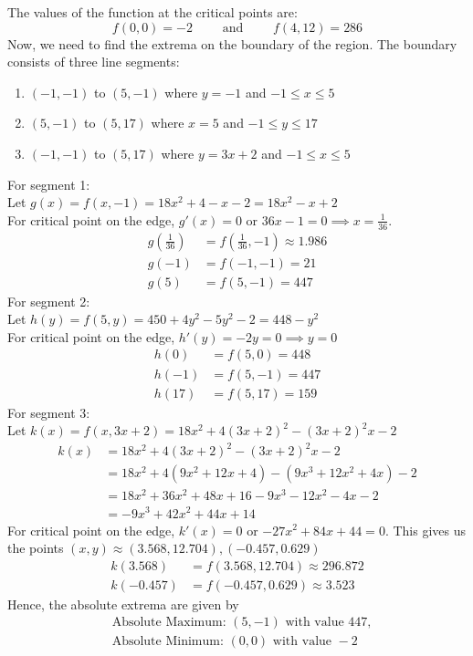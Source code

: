 {    The values of the function at the critical points are: \[ 
        f(0,0) = -2 \qquad \text{ and } \qquad f(4,12) = 286
    \]
    Now, we need to find the extrema on the boundary of the region. The boundary consists of three line segments: \\
    \begin{enumerate}
        \item $(-1,-1)$ to $(5,-1)$ where $y=-1$ and $-1\leq x\leq 5$ 
        \item $(5,-1)$ to $(5,17)$ where $x=5$ and $-1\leq y\leq 17$ 
        \item $(-1,-1)$ to $(5,17)$ where $y=3x+2$ and $-1\leq x\leq 5$
    \end{enumerate}
    For segment 1: \\ 
    Let $g(x)=f(x,-1) = 18x^2 + 4 - x - 2 = 18x^2 - x + 2$ \\
    For critical point on the edge, $g'(x)=0$ or $36x-1=0 \implies x=\frac{1}{36}$. \\
    \begin{align*}
        g\left(\frac{1}{36}\right) &= f\left(\frac{1}{36},-1\right) \approx 1.986 \\
        g(-1) &= f(-1,-1) = 21 \\ 
        g(5) &= f(5,-1) = 447
    \end{align*}
    For segment 2: \\ 
    Let $h(y)=f(5,y) = 450 + 4y^2 - 5y^2 - 2 = 448 - y^2$ \\ 
    For critical point on the edge, $h'(y) = -2y = 0 \implies y = 0$
    \begin{align*}
        h(0) &= f(5,0) = 448 \\
        h(-1) &= f(5,-1) = 447 \\ 
        h(17) &= f(5,17) = 159
    \end{align*}
    For segment 3: \\ 
    Let $k(x)=f(x,3x+2) = 18x^2 + 4(3x+2)^2 - (3x+2)^2x - 2$ \\
    \begin{align*}
        k(x) &= 18x^2 + 4(3x+2)^2 - (3x+2)^2x - 2 \\
             &= 18x^2 + 4(9x^2 + 12x + 4) - (9x^3 + 12x^2 + 4x) - 2 \\
             &= 18x^2 + 36x^2 + 48x + 16 - 9x^3 - 12x^2 - 4x - 2 \\
             &= -9x^3 + 42x^2 + 44x + 14
    \end{align*}
    For critical point on the edge, $k'(x)=0$ or $-27x^2 + 84x + 44 = 0$. This gives us the points $(x,y) \approx (3.568,12.704), (-0.457,0.629)$
    \begin{align*}
        k(3.568) &= f(3.568,12.704) \approx 296.872 \\
        k(-0.457) &= f(-0.457,0.629) \approx 3.523
    \end{align*}
    Hence, the absolute extrema are given by
    \begin{align*}
        &\text{Absolute Maximum: } (5,-1) \text{ with value } 447, \\ 
        &\text{Absolute Minimum: } (0,0) \text{ with value } -2
    \end{align*}
}

